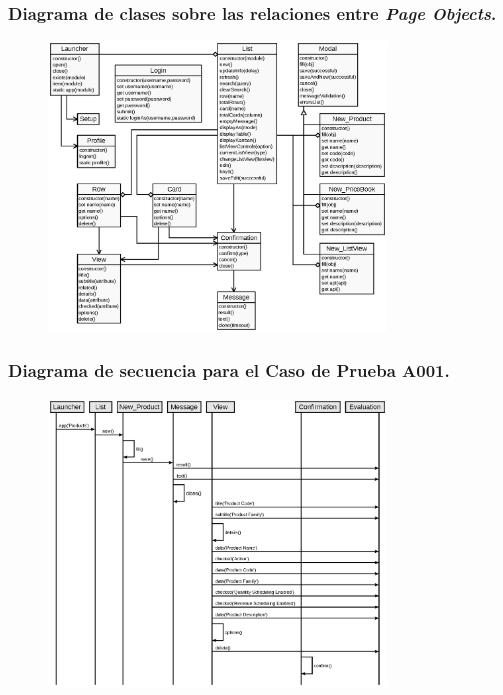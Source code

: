 \documentclass{beamer}
\begin{document}
\begin{frame}
\frametitle{Diagrama de clases sobre las relaciones entre \emph{Page Objects}.}
\begin{figure}
\centering
\includegraphics[width=0.8\textwidth]{graphics/diagram01.eps}
\end{figure}
\end{frame}

\begin{frame}
\frametitle{Diagrama de secuencia para el Caso de Prueba A001.}
\begin{figure}
\centering
\includegraphics[width=0.8\textwidth]{graphics/diagram02.eps}
\end{figure}
\end{frame}
\end{document}
